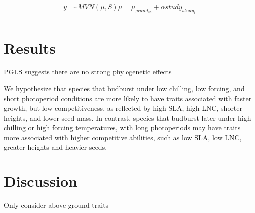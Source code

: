 \documentclass{article}\usepackage[]{graphicx}\usepackage[]{color}
\begin{document}
\begin{align*}
y & \sim MVN(\mu, S)
\mu = \mu_{grand_{sp}} + \alpha study_{study_i} \\
\end{align*}

\section{Results}
PGLS suggests there are no strong phylogenetic effects

 We hypothesize that species that budburst under low chilling, low forcing, and short photoperiod conditions are more likely to have traits associated with faster growth, but low competitiveness, as reflected by high SLA, high LNC, shorter heights, and lower seed mass. In contrast, species that budburst later under high chilling or high forcing temperatures, with long photoperiods  may have traits more associated with higher competitive abilities, such as low SLA, low LNC, greater heights and heavier seeds. 
 
\section{Discussion}

Only consider above ground traits

\pagebreak
% 

\end{document}
